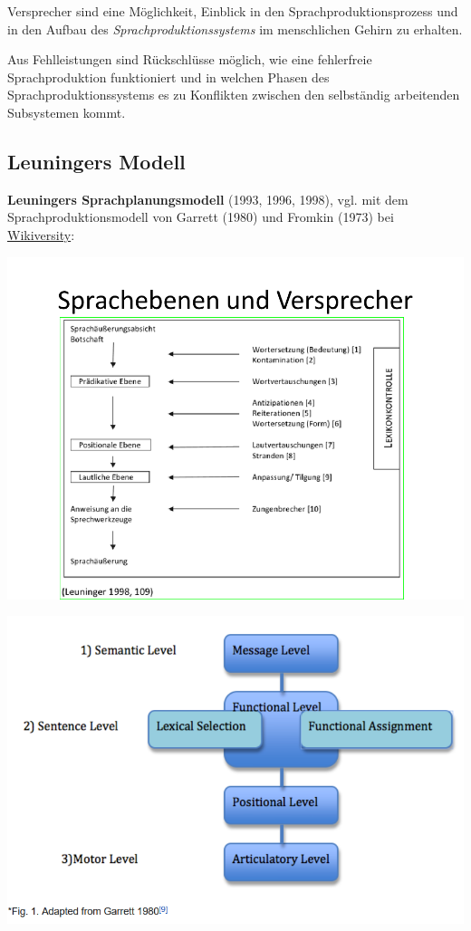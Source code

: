 \documentclass[
  letterpaper,
]{scrbook}
\begin{document}
Versprecher sind eine Möglichkeit, Einblick in den
Sprachproduktionsprozess und in den Aufbau des
\emph{Sprachproduktionssystems} im menschlichen Gehirn zu erhalten.

Aus Fehlleistungen sind Rückschlüsse möglich, wie eine fehlerfreie
Sprachproduktion funktioniert und in welchen Phasen des
Sprachproduktionssystems es zu Konflikten zwischen den selbständig
arbeitenden Subsystemen kommt.

\hypertarget{leuningers-modell}{%
\subsection{Leuningers Modell}\label{leuningers-modell}}

\textbf{Leuningers Sprachplanungsmodell} (1993, 1996, 1998), vgl. mit
dem Sprachproduktionsmodell von Garrett (1980) und Fromkin (1973) bei
\href{https://en.wikiversity.org/wiki/Psycholinguistics/Models_of_Speech_Production}{Wikiversity}:

\includegraphics[width=1\textwidth,height=\textheight]{./pictures/Versprechertypen_9.PNG}

\includegraphics[width=1\textwidth,height=\textheight]{./pictures/Garrett_1980.png}
\end{document}
